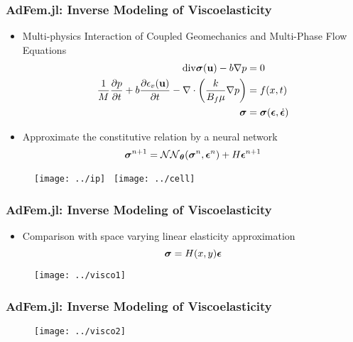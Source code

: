 \documentclass[usenames,dvipsnames]{beamer}
\newcommand{\bt}[0]{\bm{\theta}}
\newcommand{\bu}{\mathbf{u}}
\begin{document}
\begin{frame}
	\frametitle{AdFem.jl: Inverse Modeling of Viscoelasticity}
%	
	\begin{itemize}
		\item Multi-physics Interaction of Coupled Geomechanics and Multi-Phase Flow Equations 
{\small
\begin{align*}
\mathrm{div}\bsigma(\bu) - b \nabla p &= 0\\
    \frac{1}{M} \frac{\partial p}{\partial t} + b\frac{\partial \epsilon_v(\bu)}{\partial t} - \nabla\cdot\left(\frac{k}{B_f\mu}\nabla p\right) &= f(x,t)	\\
    	\bsigma &= \bsigma(\bepsilon, \dot\bepsilon)
\end{align*}
}
\item Approximate the constitutive relation by a neural network
{\small
$$\bsigma^{n+1} = \mathcal{NN}_{\bt} (\bsigma^n, \bepsilon^n) + H\bepsilon^{n+1}$$}
	\end{itemize}		
	\begin{figure}[hbt]	
	\centering
  \texttt{[image: ../ip]}~
  \texttt{[image: ../cell]}
\end{figure}

\end{frame}


\begin{frame}
	\frametitle{AdFem.jl: Inverse Modeling of Viscoelasticity}
	
	\begin{itemize}
		\item Comparison with space varying linear elasticity approximation
		\begin{equation*}
			\bm{\sigma} = H(x, y) \bm{\epsilon}
		\end{equation*}
	\end{itemize}
	\begin{figure}[hbt]
  \texttt{[image: ../visco1]}
\end{figure}

\end{frame}

\begin{frame}
	\frametitle{AdFem.jl: Inverse Modeling of Viscoelasticity}
	\begin{figure}[hbt]
  \texttt{[image: ../visco2]}
\end{figure}

\end{frame}
\end{document}
